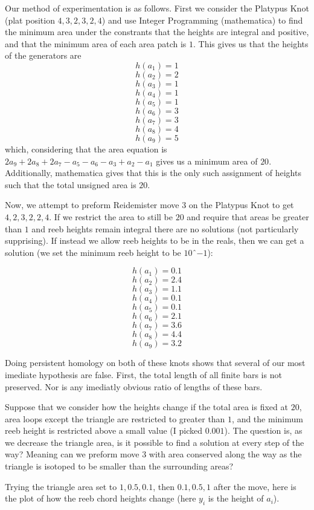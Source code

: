\documentclass[11pt,oneside]{amsart}
\begin{document}
Our method of experimentation is as follows. First we consider the Platypus Knot (plat position $4, 3, 2, 3, 2, 4$) and use Integer Programming (mathematica) to find the minimum area under the constrants that the heights are integral and positive, and that the minimum area of each area patch is $1$. This gives us that the heights of the generators are 
\[h(a_1) = 1\]
\[h(a_2) = 2\]
\[h(a_3) = 1\]
\[h(a_4) = 1\]
\[h(a_5) = 1\]
\[h(a_6) = 3\]
\[h(a_7) = 3\]
\[h(a_8) = 4\]
\[h(a_9) = 5\]
which, considering that the area equation is $2a_9 + 2a_8+2a_7 - a_5 - a_6-a_3+a_2 - a_1$ gives us a minimum area of $20$. Additionally, mathematica gives that this is the only such assignment of heights such that the total unsigned area is $20$. 


Now, we attempt to preform Reidemister move $3$ on the Platypus Knot to get $4,2,3,2,2,4$. If we restrict the area to still be $20$ and require that areas be greater than $1$ and reeb heights remain integral there are no solutions (not particularly supprising). If instead we allow reeb heights to be in the reals, then we can get a solution (we set the minimum reeb height to be $10ˆ{-1}$): 

\[h(a_1) = 0.1\]
\[h(a_2) = 2.4\]
\[h(a_3) = 1.1\]
\[h(a_4) = 0.1\]
\[h(a_5) = 0.1\]
\[h(a_6) = 2.1\]
\[h(a_7) = 3.6\]
\[h(a_8) = 4.4\]
\[h(a_9) = 3.2\]


Doing persistent homology on both of these knots shows that several of our most imediate hypothesis are false. First, the total length of all finite bars is not preserved. Nor is any imediatly obvious ratio of lengths of these bars. 




Suppose that we consider how the heights change if the total area is fixed at $20$, area loops except the triangle are restricted to greater than $1$, and the minimum reeb height is restricted above a small value (I picked $0.001$). The question is, as we decrease the triangle area, is it possible to find a solution at every step of the way? Meaning can we preform move $3$ with area conserved along the way as the triangle is isotoped to be smaller than the surrounding areas?

Trying the triangle area set to $1,0.5,0.1$, then $0.1,0.5,1$ after the move, here is the plot of how the reeb chord heights change (here $y_i$ is the height of $a_i$).
\end{document}
